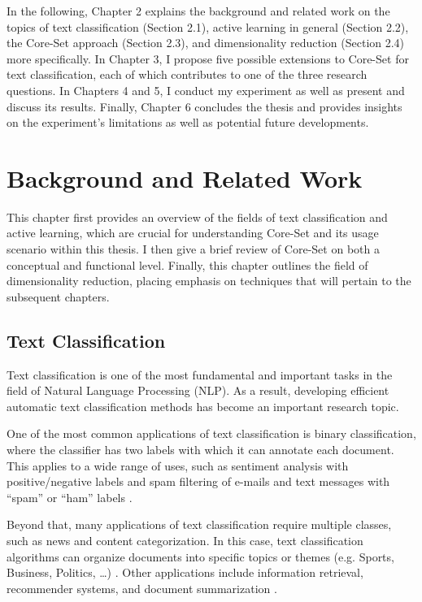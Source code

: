 \documentclass[english,bachelor,ul]{webisthesis} %
\begin{document}
In the following, Chapter 2 explains the background and related work on the topics of text classification (Section 2.1), active learning in general (Section 2.2), the Core-Set approach (Section 2.3), and dimensionality reduction (Section 2.4) more specifically. In Chapter 3, I propose five possible extensions to Core-Set for text classification, each of which contributes to one of the three research questions. In Chapters 4 and 5, I conduct my experiment as well as present and discuss its results. Finally, Chapter 6 concludes the thesis and provides insights on the experiment's limitations as well as potential future developments. 

\chapter{Background and Related Work}

This chapter first provides an overview of the fields of text classification and active learning, which are crucial for understanding Core-Set and its usage scenario within this thesis. I then give a brief review of Core-Set on both a conceptual and functional level. Finally, this chapter outlines the field of dimensionality reduction, placing emphasis on techniques that will pertain to the subsequent chapters.

\section{Text Classification}

Text classification is one of the most fundamental and important tasks in the field of Natural Language Processing (NLP). As a result, developing efficient automatic text classification methods has become an important research topic. 

One of the most common applications of text classification is binary classification, where the classifier has two labels with which it can annotate each document. This applies to a wide range of uses, such as sentiment analysis with positive/negative labels \citep{DBLP:books/sp/mining2012/LiuZ12} and spam filtering of e-mails and text messages with ``spam'' or ``ham'' labels \citep{10.1145/2034691.2034742}. 

Beyond that, many applications of text classification require multiple classes, such as news and content categorization. In this case, text classification algorithms can organize documents into specific topics or themes (e.g. Sports, Business, Politics, \dots) \citep{DBLP:journals/csur/Sebastiani02}. Other applications include information retrieval, recommender systems, and document summarization \citep{DBLP:journals/information/KowsariMHMBB19}.
\end{document}
